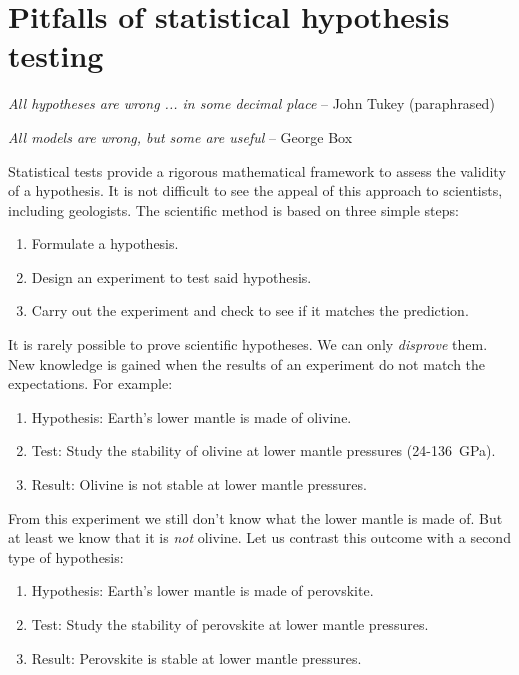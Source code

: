 \section{Pitfalls of statistical hypothesis testing}
\label{sec:pitfalls}

\hspace{\parindent}\textit{All hypotheses are wrong ... in some decimal place}
\hfill-- John Tukey (paraphrased)\medskip

\textit{All models are wrong, but some are useful}
\hfill-- George Box\medskip

Statistical tests provide a rigorous mathematical framework to assess
the validity of a hypothesis. It is not difficult to see the appeal of
this approach to scientists, including geologists. The scientific
method is based on three simple steps:

\begin{enumerate}
\item Formulate a hypothesis.
\item Design an experiment to test said hypothesis.
\item Carry out the experiment and check to see if it matches the prediction.
\end{enumerate}

It is rarely possible to prove scientific hypotheses. We can only
\emph{disprove} them. New knowledge is gained when the results of an
experiment do not match the expectations. For example:

\begin{enumerate}
\item Hypothesis: Earth's lower mantle is made of olivine.
\item Test: Study the stability of olivine at lower mantle pressures
  (24-136~GPa).
\item Result: Olivine is not stable at lower mantle pressures.
\end{enumerate}

From this experiment we still don't know what the lower mantle is made
of.  But at least we know that it is \emph{not} olivine. Let us
contrast this outcome with a second type of hypothesis:

\begin{enumerate}
\item Hypothesis: Earth's lower mantle is made of perovskite.
\item Test: Study the stability of perovskite at lower mantle
  pressures.
\item Result: Perovskite is stable at lower mantle pressures.
\end{enumerate}

